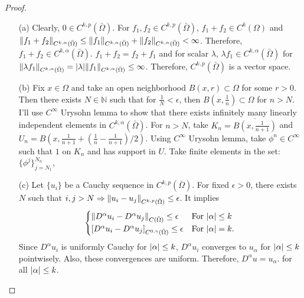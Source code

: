 \documentclass{article}
\begin{document}
\begin{proof}
\begin{enumerate}
\item[(a)] Clearly, $0\in C^{k,p}(\bar{\Omega})$. For $f_1, f_2\in C^{k,p}(\bar{\Omega})$, $f_1+f_2\in C^k(\Omega)$ and $\norm{f_1+f_2}_{C^{k,\alpha}(\bar{\Omega})}\leq \norm{f_1}_{C^{k,\alpha}(\bar{\Omega})}+\norm{f_2}_{C^{k,\alpha}(\bar{\Omega})}< \infty$. Therefore, $f_1+f_2\in {C^{k,\alpha}(\bar{\Omega})}$. $f_1+f_2=f_2+f_1$ and for scalar $\lambda$, $\lambda f_1\in {C^{k,\alpha}(\bar{\Omega})}$ for $\norm{\lambda f_1}_{C^{k,\alpha}(\bar{\Omega})}=\abs{\lambda}\norm{f_1}_{C^{k,\alpha}(\bar{\Omega})}\leq \infty$. Therefore, $C^{k,p}(\bar{\Omega})$ is a vector space.
\item[(b)] Fix $x\in \Omega$ and take an open neighborhood $B(x,r)\subset \Omega$ for some $r>0$. Then there exists $N\in \mathbb{N}$ such that for $\frac{1}{N}<\epsilon$, then $B(x, \frac{1}{n})\subset \Omega$ for $n>N$. I'll use $C^\infty$ Urysohn lemma to show that there exists infinitely many linearly independent elements in $C^{k,\alpha}(\bar{\Omega})$. For $n>N$, take $K_n=\overline{B(x, \frac{1}{n+1})}$ and $U_n=B\left(x, \frac{1}{n+1}+\left(\frac{1}{n}-\frac{1}{n+1}\right)/2\right)$. Using $C^\infty$ Urysohn lemma, take $\phi^n\in C^\infty$ such that $1$ on $K_n$ and has support in $U$. Take finite elements in the set: $\{\phi^j\}_{j=N_1}^{N_n}$,
\item[(c)] Let $\{u_i\}$ be a Cauchy sequence in $C^{k,p}(\bar{\Omega})$. For fixed $\epsilon>0$, there exists $N$ such that $i,j>N\Rightarrow \norm{u_i-u_j}_{C^{k,p}(\bar{\Omega})}\leq \epsilon$. It implies
\begin{equation*}
\begin{cases}
\norm{D^\alpha u_i-D^\alpha u_j}_{C(\bar{\Omega})}\leq \epsilon & \text{For }\abs{\alpha}\leq k \\
\left[D^\alpha u_i-D^\alpha u_j\right]_{C^{0,\gamma}(\bar{\Omega})}\leq \epsilon & \text{For }\abs{\alpha}=k.
\end{cases}
\end{equation*}
Since $D^\alpha u_i$ is uniformly Cauchy for $\abs{\alpha}\leq k$, $D^\alpha u_i$ converges to $u_\alpha$ for $\abs{\alpha}\leq k$ pointwisely. Also, these convergences are uniform. Therefore, $D^\alpha u=u_\alpha$. for all $\abs{\alpha}\leq k$.


\end{enumerate}
\end{proof}
\end{document}
